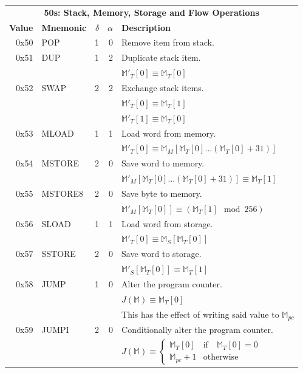 \documentclass[9pt,oneside]{amsart}
\begin{document}
\begin{tabular*}{\columnwidth}[h]{rlrrl}
\toprule
\multicolumn{5}{c}{\textbf{50s: Stack, Memory, Storage and Flow Operations}} \vspace{5pt} \\
\textbf{Value} & \textbf{Mnemonic} & $\delta$ & $\alpha$ & \textbf{Description} \vspace{5pt} \\
0x50 & {\small POP} & 1 & 0 & Remove item from stack. \\
\midrule
0x51 & {\small DUP} & 1 & 2 & Duplicate stack item. \\
&&&& $\mathbb{M}'_T[0] \equiv \mathbb{M}_T[0]$ \\
\midrule
0x52 & {\small SWAP} & 2 & 2 & Exchange stack items. \\
&&&& $\mathbb{M}'_T[0] \equiv \mathbb{M}_T[1]$ \\
&&&& $\mathbb{M}'_T[1] \equiv \mathbb{M}_T[0]$ \\
\midrule
0x53 & {\small MLOAD} & 1 & 1 & Load word from memory. \\
&&&& $\mathbb{M}'_T[0] \equiv \mathbb{M}_M[\mathbb{M}_T[0] \dots (\mathbb{M}_T[0] + 31) ]$ \\
\midrule
0x54 & {\small MSTORE} & 2 & 0 & Save word to memory. \\
&&&& $\mathbb{M}'_M[ \mathbb{M}_T[0] \dots (\mathbb{M}_T[0] + 31) ] \equiv \mathbb{M}_T[1]$ \\
\midrule
0x55 & {\small MSTORE8} & 2 & 0 & Save byte to memory. \\
&&&& $\mathbb{M}'_M[ \mathbb{M}_T[0] ] \equiv (\mathbb{M}_T[1] \mod 256) $ \\
\midrule
0x56 & {\small SLOAD} & 1 & 1 & Load word from storage. \\
&&&& $\mathbb{M}'_T[0] \equiv \mathbb{M}_S[\mathbb{M}_T[0]]$ \\
\midrule
0x57 & {\small SSTORE} & 2 & 0 & Save word to storage. \\
&&&& $\mathbb{M}'_S[ \mathbb{M}_T[0] ] \equiv \mathbb{M}_T[1] $ \\
\midrule
0x58 & {\small JUMP} & 1 & 0 & Alter the program counter. \\
&&&& $J(\mathbb{M}) \equiv \mathbb{M}_T[0] $ \\
&&&& This has the effect of writing said value to $\mathbb{M}_{pc}$ \\
\midrule
0x59 & {\small JUMPI} & 2 & 0 & Conditionally alter the program counter. \\
&&&& $J(\mathbb{M}) \equiv \begin{cases} \mathbb{M}_T[0] & \text{if} \quad \mathbb{M}_T[0] = 0 \\ \mathbb{M}_{pc} + 1 & \text{otherwise} \end{cases} $ \\

\end{tabular*}
\end{document}
